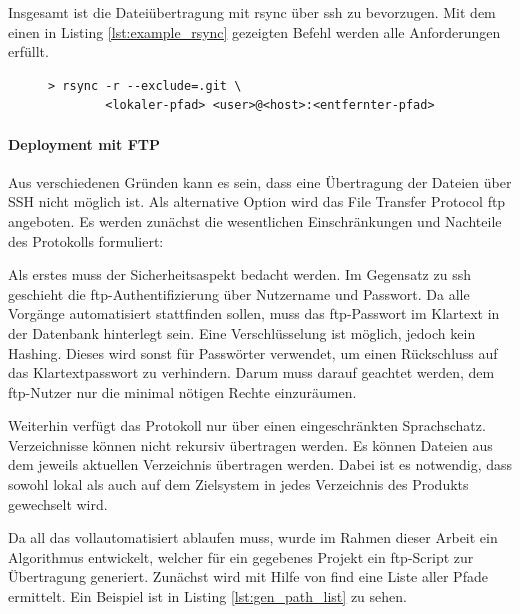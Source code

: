 Insgesamt ist die Dateiübertragung mit rsync über \gls{ssh} zu bevorzugen. Mit dem einen in Listing \ref{lst:example_rsync} gezeigten Befehl werden alle Anforderungen erfüllt.

\begin{figure}
	\begin{lstlisting}[caption=Beispiel rsync Befehl,label={lst:example_rsync}]
	> rsync -r --exclude=.git \
		<lokaler-pfad> <user>@<host>:<entfernter-pfad>
	\end{lstlisting}
\end{figure}


\paragraph{Deployment mit FTP} %
\label{par:deployment_mit_ftp}

Aus verschiedenen Gründen kann es sein, dass eine Übertragung der Dateien über SSH nicht möglich ist. Als alternative Option wird das File Transfer Protocol \gls{ftp} angeboten. Es werden zunächst die wesentlichen Einschränkungen und Nachteile des Protokolls formuliert:

Als erstes muss der Sicherheitsaspekt bedacht werden. Im Gegensatz zu \gls{ssh} geschieht die \gls{ftp}-Authentifizierung über Nutzername und Passwort. Da alle Vorgänge automatisiert stattfinden sollen, muss das \gls{ftp}-Passwort im Klartext in der Datenbank hinterlegt sein. Eine Verschlüsselung ist möglich, jedoch kein Hashing. Dieses wird sonst für Passwörter verwendet, um einen Rückschluss auf das Klartextpasswort zu verhindern. Darum muss darauf geachtet werden, dem \gls{ftp}-Nutzer nur die minimal nötigen Rechte einzuräumen.

Weiterhin verfügt das Protokoll nur über einen eingeschränkten Sprachschatz. Verzeichnisse können nicht rekursiv übertragen werden. Es können Dateien aus dem jeweils aktuellen Verzeichnis übertragen werden. Dabei ist es notwendig, dass sowohl lokal als auch auf dem Zielsystem in jedes Verzeichnis des Produkts gewechselt wird.

Da all das vollautomatisiert ablaufen muss, wurde im Rahmen dieser Arbeit ein Algorithmus entwickelt, welcher für ein gegebenes Projekt ein \gls{ftp}-Script zur Übertragung generiert. Zunächst wird mit Hilfe von find eine Liste aller Pfade ermittelt. Ein Beispiel ist in Listing \ref{lst:gen_path_list} zu sehen.

